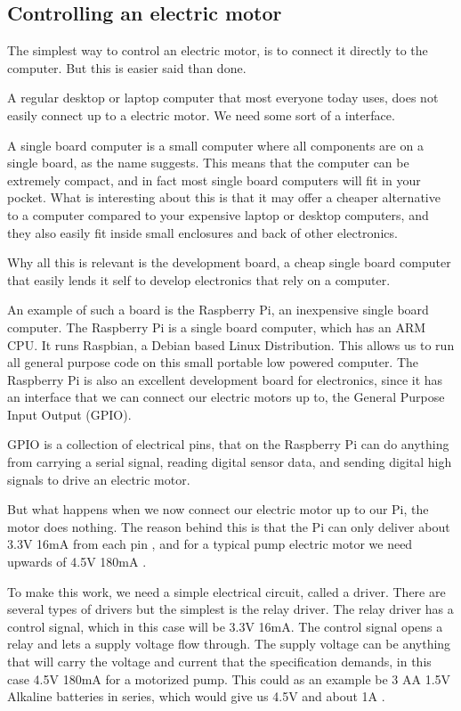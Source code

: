 \documentclass[12pt,a4paper,oneside]{book}
\begin{document}
\subsection{Controlling an electric motor}
The simplest way to control an electric motor, is to connect it directly to the computer. But this is easier said than done.

A regular desktop or laptop computer that most everyone today uses, does not easily connect up to a electric motor. We need some sort of a interface.

A single board computer is a small computer where all components are on a single board, as the name suggests.
This means that the computer can be extremely compact, and in fact most single board computers will fit in your pocket.
What is interesting about this is that it may offer a cheaper alternative to a computer compared to your expensive laptop or desktop computers, and they also easily fit inside small enclosures and back of other electronics.

Why all this is relevant is the development board, a cheap single board computer that easily lends it self to develop electronics that rely on a computer.

An example of such a board is the Raspberry Pi, an inexpensive single board computer.
The Raspberry Pi is a single board computer, which has an ARM CPU.
It runs Raspbian, a Debian based Linux Distribution.
This allows us to run all general purpose code on this small portable low powered computer.
The Raspberry Pi is also an excellent development board for electronics, since it has an interface that we can connect our electric motors up to, the General Purpose Input Output (GPIO).

GPIO is a collection of electrical pins, that on the Raspberry Pi can do anything from carrying a serial signal, reading digital sensor data, and sending digital high signals to drive an electric motor.

But what happens when we now connect our electric motor up to our Pi, the motor does nothing.
The reason behind this is that the Pi can only deliver about 3.3V 16mA from each pin \cite{pi_pin_current}, and for a typical pump electric motor we need upwards of 4.5V 180mA \cite{aliexpress_pump}.

To make this work, we need a simple electrical circuit, called a driver. There are several types of drivers but the simplest is the relay driver.
The relay driver has a control signal, which in this case will be 3.3V 16mA.
The control signal opens a relay and lets a supply voltage flow through.
The supply voltage can be anything that will carry the voltage and current that the specification demands, in this case 4.5V 180mA for a motorized pump. This could as an example be 3 AA 1.5V Alkaline batteries in series, which would give us 4.5V and about 1A \cite{battery_current}.
\end{document}
